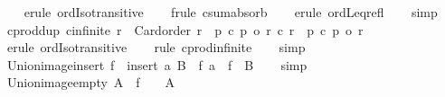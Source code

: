 \begin{isabellebody}
%
\isadelimproof
\ \ %
\endisadelimproof
%
\isatagproof
{}\isamarkupfalse%
\ {\isacharparenleft}{\kern0pt}erule\ ordIso{\isacharunderscore}{\kern0pt}transitive{\isacharparenright}{\kern0pt}\isanewline
\ \ \isamarkupfalse%
\ {\isacharparenleft}{\kern0pt}frule\ csum{\isacharunderscore}{\kern0pt}absorb{}{\isacharprime}{\kern0pt}{\isacharparenright}{\kern0pt}\isanewline
\ \ \isamarkupfalse%
\ {\isacharparenleft}{\kern0pt}erule\ ordLeq{\isacharunderscore}{\kern0pt}refl{\isacharparenright}{\kern0pt}\isanewline
\ \ \isamarkupfalse%
\ simp%
\endisatagproof
{\isafoldproof}%
%
\isadelimproof
\isanewline
%
\endisadelimproof
\isanewline
{}\isamarkupfalse%
\ cprod{\isacharunderscore}{\kern0pt}dup{\isacharcolon}{\kern0pt}\ {\isachardoublequoteopen}cinfinite\ r\ {\isasymLongrightarrow}\ Card{\isacharunderscore}{\kern0pt}order\ r\ {\isasymLongrightarrow}\ p\ {\isacharasterisk}{\kern0pt}c\ p{\isacharprime}{\kern0pt}\ {\isacharequal}{\kern0pt}o\ r\ {\isacharasterisk}{\kern0pt}c\ r\ {\isasymLongrightarrow}\ p\ {\isacharasterisk}{\kern0pt}c\ p{\isacharprime}{\kern0pt}\ {\isacharequal}{\kern0pt}o\ r{\isachardoublequoteclose}\isanewline
%
\isadelimproof
\ \ %
\endisadelimproof
%
\isatagproof
{}\isamarkupfalse%
\ {\isacharparenleft}{\kern0pt}erule\ ordIso{\isacharunderscore}{\kern0pt}transitive{\isacharparenright}{\kern0pt}\isanewline
\ \ \isamarkupfalse%
\ {\isacharparenleft}{\kern0pt}rule\ cprod{\isacharunderscore}{\kern0pt}infinite{\isacharparenright}{\kern0pt}\isanewline
\ \ \isamarkupfalse%
\ simp%
\endisatagproof
{\isafoldproof}%
%
\isadelimproof
\isanewline
%
\endisadelimproof
\isanewline
{}\isamarkupfalse%
\ Union{\isacharunderscore}{\kern0pt}image{\isacharunderscore}{\kern0pt}insert{\isacharcolon}{\kern0pt}\ {\isachardoublequoteopen}{\isasymUnion}{\isacharparenleft}{\kern0pt}f\ {\isacharbackquote}{\kern0pt}\ insert\ a\ B{\isacharparenright}{\kern0pt}\ {\isacharequal}{\kern0pt}\ f\ a\ {\isasymunion}\ {\isasymUnion}{\isacharparenleft}{\kern0pt}f\ {\isacharbackquote}{\kern0pt}\ B{\isacharparenright}{\kern0pt}{\isachardoublequoteclose}\isanewline
%
\isadelimproof
\ \ %
\endisadelimproof
%
\isatagproof
{}\isamarkupfalse%
\ simp%
\endisatagproof
{\isafoldproof}%
%
\isadelimproof
\isanewline
%
\endisadelimproof
\isanewline
{}\isamarkupfalse%
\ Union{\isacharunderscore}{\kern0pt}image{\isacharunderscore}{\kern0pt}empty{\isacharcolon}{\kern0pt}\ {\isachardoublequoteopen}A\ {\isasymunion}\ {\isasymUnion}{\isacharparenleft}{\kern0pt}f\ {\isacharbackquote}{\kern0pt}\ {\isacharbraceleft}{\kern0pt}{\isacharbraceright}{\kern0pt}{\isacharparenright}{\kern0pt}\ {\isacharequal}{\kern0pt}\ A{\isachardoublequoteclose}\isanewline

\end{isabellebody}
